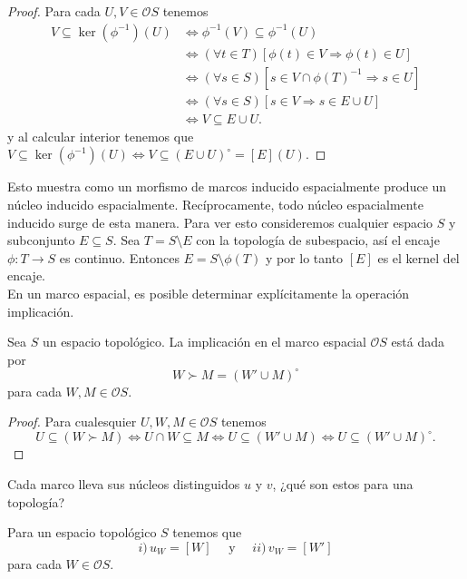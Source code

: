 \begin{proof}
    Para cada $U,V\in \mathcal{O}S$ tenemos 
    \[
    \begin{split}
    V\subseteq \ker(\phi^{-1})(U) &\Leftrightarrow \phi^{-1}(V)\subseteq \phi^{-1}(U)\\
    & \Leftrightarrow (\forall t\in T)[\phi(t)\in V\Rightarrow \phi(t)\in U]\\
    & \Leftrightarrow (\forall s\in S)[s\in V\cap \phi(T)^{-1}\Rightarrow s\in U]\\
    & \Leftrightarrow (\forall s\in S)[s\in V\Rightarrow s\in E\cup U]\\
    & \Leftrightarrow V\subseteq E\cup U.
    \end{split}
    \]
    y al calcular interior tenemos que $V\subseteq \ker(\phi^{-1})(U)\Leftrightarrow V\subseteq (E\cup U)^\circ =[E](U)$.
\end{proof}

Esto muestra como un morfismo de marcos inducido espacialmente produce un núcleo inducido espacialmente. Recíprocamente, todo núcleo espacialmente inducido surge de esta manera. Para ver esto consideremos cualquier espacio $S$ y subconjunto $E\subseteq S$. Sea $T=S\setminus E$ con la topología de subespacio, así el encaje $\phi\colon T\to S$ es continuo. Entonces $E=S\setminus \phi(T)$ y por lo tanto $[E]$ es el kernel del encaje.\\

En un marco espacial, es posible determinar explícitamente la operación implicación.

\begin{lem}\label{ImplicacionTop}
    Sea $S$ un espacio topológico. La implicación en el marco espacial $\mathcal{O}S$ está dada por 
    \[
    W\succ M=(W'\cup M)^\circ
    \]
    para cada $W, M\in \mathcal{O}S$.
\end{lem}

\begin{proof}
    Para cualesquier $U, W, M\in \mathcal{O}S$ tenemos 
    \[
    U\subseteq (W\succ M)\Leftrightarrow U\cap W\subseteq M\Leftrightarrow U\subseteq (W'\cup M)\Leftrightarrow U\subseteq (W'\cup M)^\circ.
    \]
\end{proof}

Cada marco lleva sus núcleos distinguidos $u$ y $v$, ¿qué son estos para una topología?

\begin{lem}\label{UVTop}
     Para un espacio topológico $S$ tenemos que 
     \[
     i)\,u_W=[W]\quad\mbox{ y }\quad ii)\,v_W=[W']
     \]
     para cada $W\in \mathcal{O}S$.
\end{lem}

